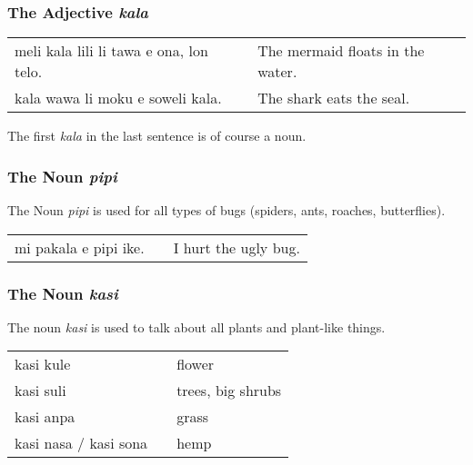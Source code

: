 %
\subsubsection*{The Adjective \textit{kala}}
%
%
\begin{supertabular}{p{5,5cm}|ll}
    meli kala lili li tawa e ona, lon telo. &  & The mermaid floats in the water. \\
    kala wawa li moku e soweli kala.        &  & The shark eats the seal.         \\
\end{supertabular}

The first \textit{kala} in the last sentence is of course a noun.

%
%
\subsubsection*{The Noun \textit{pipi}}
%
%
The Noun \textit{pipi} is used for all types of bugs (spiders, ants, roaches, butterflies).

\begin{supertabular}{p{5,5cm}|ll}
    mi pakala e pipi ike. &  & I hurt the ugly bug. \\
\end{supertabular}

%
%
\subsubsection*{The Noun \textit{kasi}}
%
%
The noun \textit{kasi} is used to talk about all plants and plant-like things.

\begin{supertabular}{p{5,5cm}|ll}
    kasi kule             &  & flower            \\
    kasi suli             &  & trees, big shrubs \\
    kasi anpa             &  & grass             \\
    kasi nasa / kasi sona &  & hemp              \\
\end{supertabular}

